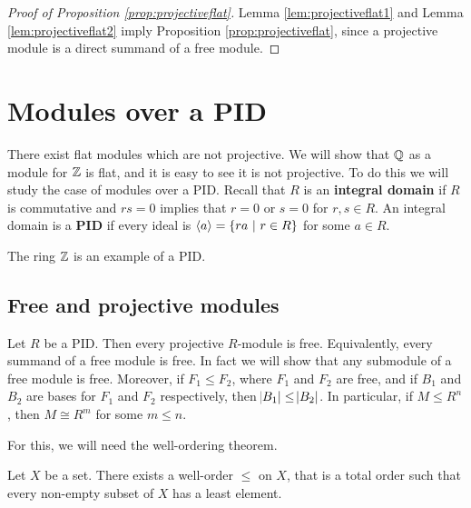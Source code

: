 \begin{proof}[Proof of Proposition \ref{prop:projectiveflat}]
Lemma \ref{lem:projectiveflat1} and Lemma \ref{lem:projectiveflat2} imply Proposition \ref{prop:projectiveflat}, since a projective module is a direct summand of a free module.
\end{proof}

\pagebreak

\section{Modules over a PID}

There exist flat modules which are not projective. We will show that $ \mathbb{Q} $ as a module for $ \mathbb{Z} $ is flat, and it is easy to see it is not projective. To do this we will study the case of modules over a PID. Recall that $ R $ is an \textbf{integral domain} if $ R $ is commutative and $ rs = 0 $ implies that $ r = 0 $ or $ s = 0 $ for $ r, s \in R $. An integral domain is a \textbf{PID} if every ideal is $ \abr{a} = \cbr{ra \st r \in R} $ for some $ a \in R $.

\begin{example*}
The ring $ \mathbb{Z} $ is an example of a PID.
\end{example*}

\subsection{Free and projective modules}

\begin{proposition}
Let $ R $ be a PID. Then every projective $ R $-module is free. Equivalently, every summand of a free module is free. In fact we will show that any submodule of a free module is free. Moreover, if $ F_1 \le F_2 $, where $ F_1 $ and $ F_2 $ are free, and if $ B_1 $ and $ B_2 $ are bases for $ F_1 $ and $ F_2 $ respectively, then $ \abs{B_1} \le \abs{B_2} $. In particular, if $ M \le R^n $, then $ M \cong R^m $ for some $ m \le n $.
\end{proposition}

For this, we will need the well-ordering theorem.

\begin{theorem}
Let $ X $ be a set. There exists a well-order $ \le $ on $ X $, that is a total order such that every non-empty subset of $ X $ has a least element.
\end{theorem}

